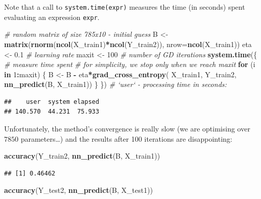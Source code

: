 \documentclass[10pt,b5paper,krantz1]{krantz}
\newenvironment{Shaded}{\begin{snugshade}}{\end{snugshade}}
\newcommand{\CommentTok}[1]{\textcolor[rgb]{0.37,0.37,0.37}{\textit{#1}}}
\newcommand{\ControlFlowTok}[1]{\textcolor[rgb]{0.27,0.27,0.27}{\textbf{#1}}}
\newcommand{\DataTypeTok}[1]{\textcolor[rgb]{0.27,0.27,0.27}{#1}}
\newcommand{\DecValTok}[1]{\textcolor[rgb]{0.06,0.06,0.06}{#1}}
\newcommand{\FloatTok}[1]{\textcolor[rgb]{0.06,0.06,0.06}{#1}}
\newcommand{\KeywordTok}[1]{\textcolor[rgb]{0.27,0.27,0.27}{\textbf{#1}}}
\newcommand{\NormalTok}[1]{#1}
\newcommand{\OperatorTok}[1]{\textcolor[rgb]{0.43,0.43,0.43}{\textbf{#1}}}
\newcommand{\StringTok}[1]{\textcolor[rgb]{0.5,0.5,0.5}{#1}}
\begin{document}
Note that a call to \texttt{system.time(expr)} measures the time (in seconds)
spent evaluating an expression \texttt{expr}.

\begin{Shaded}
\begin{Highlighting}[]
\CommentTok{# random matrix of size 785x10 - initial guess}
\NormalTok{B <-}\StringTok{ }\KeywordTok{matrix}\NormalTok{(}\KeywordTok{rnorm}\NormalTok{(}\KeywordTok{ncol}\NormalTok{(X_train1)}\OperatorTok{*}\KeywordTok{ncol}\NormalTok{(Y_train2)),}
    \DataTypeTok{nrow=}\KeywordTok{ncol}\NormalTok{(X_train1))}
\NormalTok{eta <-}\StringTok{ }\FloatTok{0.1}   \CommentTok{# learning rate}
\NormalTok{maxit <-}\StringTok{ }\DecValTok{100} \CommentTok{# number of GD iterations}
\KeywordTok{system.time}\NormalTok{(\{ }\CommentTok{# measure time spent}
    \CommentTok{# for simplicity, we stop only when we reach maxit}
    \ControlFlowTok{for}\NormalTok{ (i }\ControlFlowTok{in} \DecValTok{1}\OperatorTok{:}\NormalTok{maxit) \{}
\NormalTok{        B <-}\StringTok{ }\NormalTok{B }\OperatorTok{-}\StringTok{ }\NormalTok{eta}\OperatorTok{*}\KeywordTok{grad_cross_entropy}\NormalTok{(}
\NormalTok{            X_train1, Y_train2, }\KeywordTok{nn_predict}\NormalTok{(B, X_train1))}
\NormalTok{    \}}
\NormalTok{\}) }\CommentTok{# `user` - processing time in seconds:}
\end{Highlighting}
\end{Shaded}

\begin{verbatim}
##    user  system elapsed 
## 140.570  44.231  75.933
\end{verbatim}

Unfortunately, the method's convergence is really slow
(we are optimising over \(7850\) parameters\ldots{})
and the results after 100 iterations are disappointing:

\begin{Shaded}
\begin{Highlighting}[]
\KeywordTok{accuracy}\NormalTok{(Y_train2, }\KeywordTok{nn_predict}\NormalTok{(B, X_train1))}
\end{Highlighting}
\end{Shaded}

\begin{verbatim}
## [1] 0.46462
\end{verbatim}

\begin{Shaded}
\begin{Highlighting}[]
\KeywordTok{accuracy}\NormalTok{(Y_test2,  }\KeywordTok{nn_predict}\NormalTok{(B, X_test1))}
\end{Highlighting}
\end{Shaded}
\end{document}
